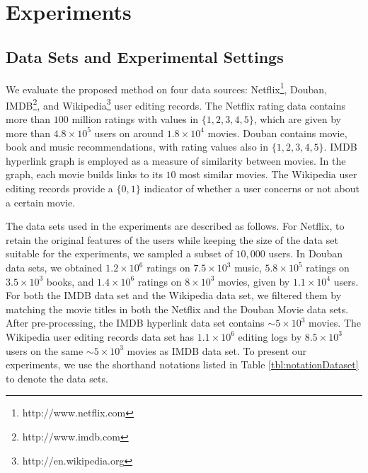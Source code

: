 
\chapter{Experiments}
\label{chp:exp}

\hspace{0.1in}
\section{Data Sets and Experimental Settings} \label{sec:DataSets}
We evaluate the proposed method on four data sources:
Netflix\footnote{http://www.netflix.com},
Douban,
IMDB\footnote{http://www.imdb.com},
and Wikipedia\footnote{http://en.wikipedia.org} user editing records.
The Netflix rating data contains more than $100$ million ratings with values in $\{1, 2, 3, 4, 5\}$, which are given by more than $4.8\times 10^5$ users
on around $1.8\times 10^4$ movies.
Douban contains movie, book and music recommendations, with rating values also in $\{1, 2, 3, 4, 5\}$.
IMDB hyperlink graph is employed as a measure of similarity between movies.
In the graph, each movie builds links to its $10$ most similar movies.
The Wikipedia user editing records provide a $\{0, 1\}$ indicator of whether a user concerns or not about a certain movie.

The data sets used in the experiments are described as follows. For Netflix, to retain the original features of the users while keeping the size of the data set suitable for the experiments, we sampled a subset of $10,000$ users.
In Douban data sets, we obtained $1.2 \times 10^6$ ratings on $7.5 \times 10^3$ music, $ 5.8 \times 10^5 $ ratings on $3.5 \times 10^3 $ books, and $1.4 \times 10^6 $ ratings on $8 \times 10^3$ movies, given by $1.1 \times 10^4 $ users.
For both the IMDB data set and the Wikipedia data set, we filtered them by matching the movie titles in both the Netflix and the Douban Movie data sets. After pre-processing, the IMDB hyperlink data set contains $\sim 5 \times 10^3$ movies. The Wikipedia user editing records data set has $1.1 \times 10^6$ editing logs by $8.5 \times 10^3$ users on the same $\sim 5 \times 10^3$ movies as IMDB data set.
To present our experiments, we use the shorthand notations listed in Table \ref{tbl:notationDataset} to denote the data sets.



